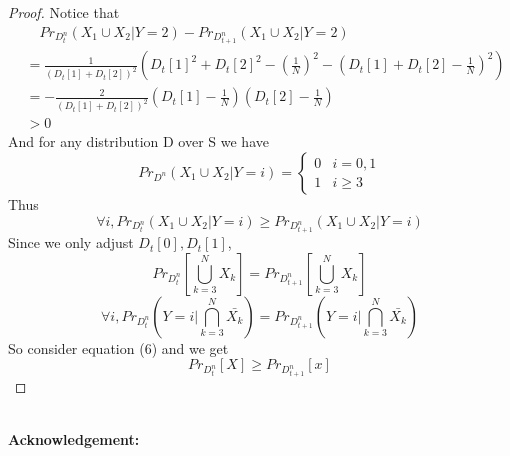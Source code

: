 \documentclass{article}
\newcommand{\Acknowledgement}[1]{\ \\{\bf Acknowledgement:} #1}
\begin{document}
\begin{spacing}{1.1}
\begin{proof}
        Notice that 
        \begin{equation}
            \begin{aligned}
                &\quad Pr_{D_t^n}(X_1\cup X_2 | Y = 2) - Pr_{D_{t+1}^n}(X_1\cup X_2 | Y = 2)\\
                &= \frac{1}{(D_t[1] + D_t[2])^2}(D_t[1]^2 + D_t[2]^2 - (\frac{1}{N})^2 - (D_t[1] + D_t[2] - \frac{1}{N})^2)\\
                &= -\frac{2}{(D_t[1] + D_t[2])^2}(D_t[1] - \frac{1}{N})(D_t[2] - \frac{1}{N})\\
                &> 0
            \end{aligned}
        \end{equation}
        And for any distribution D over S we have
        \begin{equation}
            Pr_{D^n}(X_1\cup X_2 | Y = i) =
            \begin{cases}
                0 & i = 0, 1\\
                1 & i \geq 3
            \end{cases}
        \end{equation}
        Thus
        $$\forall i, Pr_{D_t^n}(X_1\cup X_2 | Y = i) \geq Pr_{D_{t+1}^n}(X_1\cup X_2 | Y = i)$$
        Since we only adjust $D_t[0], D_t[1]$,
        $$Pr_{D_t^n}[\bigcup_{k = 3}^N X_k] = Pr_{D_{t+1}^n}[\bigcup_{k = 3}^N X_k]$$
        $$\forall i, Pr_{D_t^n}(Y = i | \bigcap_{k = 3}^N \bar{X_k}) = Pr_{D_{t+1}^n}(Y = i | \bigcap_{k = 3}^N \bar{X_k})$$
        So consider equation (6) and we get
        $$Pr_{D_t^n}[X] \geq Pr_{D_{t+1}^n}[x]$$
    \end{proof}
    \Acknowledgement{}
    
    
    \end{spacing}
    
\end{document}
